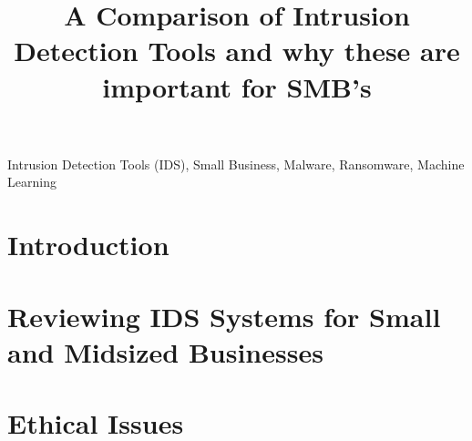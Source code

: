 \documentclass[conference]{IEEEtran}
\begin{document}
\title{A Comparison of Intrusion Detection Tools and why these are important for SMB's\\}

\author{
}


\maketitle




\begin{IEEEkeywords}

Intrusion Detection Tools (IDS), Small Business, Malware, Ransomware, Machine Learning

\end{IEEEkeywords}

\section{Introduction}


\section{Reviewing IDS Systems for Small and Midsized Businesses}


\newpage

\section{Ethical Issues}

\end{document}
